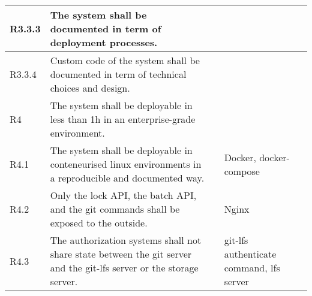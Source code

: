 \documentclass[a4paper,11pt]{article}
\begin{document}
\begin{landscape}
\begin{longtable}{|p{1cm}|p{19cm}|p{2cm}|p{3cm}|}
        \rowcolor[HTML]{EEFFEE}        R3.3.3     & The system shall be documented in term of deployment processes.                                                                                                                                                                                                                       &                       &                                          \\\hline
        \rowcolor[HTML]{EEFFEE}        R3.3.4     & Custom code of the system shall be documented in term of technical choices and design.                                                                                                                                                                                                &                       &                                          \\\hline
        \rowcolor[HTML]{C0C0C0}        R4         & The system shall be deployable in less than 1h in an enterprise-grade environment.                                                                                                                                                                                                    &                       &                                          \\ \hline
        \rowcolor[HTML]{DDFFDD}        R4.1       & The system shall be deployable in conteneurised linux environments in a reproducible and documented way.                                                                                                                                                                              &                       & Docker, docker-compose                   \\ \hline
        \rowcolor[HTML]{DDFFDD}        R4.2       & Only the lock API, the batch API, and the git commands shall be exposed to the outside.                                                                                                                                                                                               &                       & Nginx                                    \\ \hline
        \rowcolor[HTML]{DDFFDD}        R4.3       & The authorization systems shall not share state between the git server and the git-lfs server or the storage server.                                                                                                                                                                  &                       & git-lfs authenticate command, lfs server \\ \hline

\end{longtable}
\end{landscape}
\end{document}
